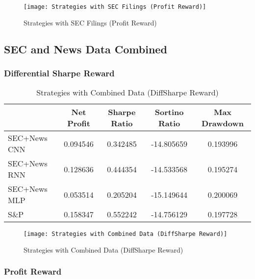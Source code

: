 \begin{center}
    \begin{figure}
    \texttt{[image: Strategies with SEC Filings (Profit Reward)]}
    \caption{Strategies with SEC Filings (Profit Reward)}
    \end{figure}
\end{center}



\subsection{SEC and News Data Combined}

\subsubsection{Differential Sharpe Reward}

\begin{table}[htbp]
    \centering
    \caption{Strategies with Combined Data (DiffSharpe Reward)}
      \begin{tabular}{lcccc}
      \toprule
            & Net Profit & Sharpe Ratio & Sortino Ratio & Max Drawdown \\
      \midrule
      SEC+News CNN & 0.094546 & 0.342485 & -14.805659 & 0.193996 \\
      SEC+News RNN & 0.128636 & 0.444354 & -14.533568 & 0.195274 \\
      SEC+News MLP & 0.053514 & 0.205204 & -15.149644 & 0.200069 \\
      S\&P   & 0.158347 & 0.552242 & -14.756129 & 0.197728 \\
      \bottomrule
      \end{tabular}%
    \label{tab:combined_sharpe}%
  \end{table}%

  \begin{center}
    \begin{figure}
    \texttt{[image: Strategies with Combined Data (DiffSharpe Reward)]}
    \caption{Strategies with Combined Data (DiffSharpe Reward)}
    \label{fig:combined_sharpe}
    \end{figure}
\end{center}

\subsubsection{Profit Reward}

